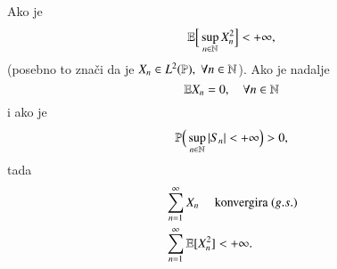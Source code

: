 \begin{prop}    \label{prop:13.13}
    Ako je
    \begin{equation*}
        \mathbb{E} \Big[ \sup\limits_{n \in \mathbb{N}} X_n^2 \Big] < + \infty,
    \end{equation*}
    (posebno to zna\v ci da je $X_n \in L^2 (\mathbb{P}), \; \forall n \in \mathbb{N}$).
    Ako je nadalje
    \begin{equation*}
        \mathbb{E} X_n = 0, \quad \forall n \in \mathbb{N}
    \end{equation*}
    i ako je
    \begin{equation*}
        \mathbb{P} \Big( \sup\limits_{n \in \mathbb{N}} |S_n| < + \infty \Big) > 0,
    \end{equation*}
    tada
    \begin{equation*}
        \begin{aligned}
            & \sum\limits_{n = 1}^{\infty} X_n \quad \textnormal{ konvergira } (g.s.)\\
            & \sum\limits_{n = 1}^{\infty} \mathbb{E} [ X_n^2 ] < + \infty.
        \end{aligned}
    \end{equation*}
\end{prop}

